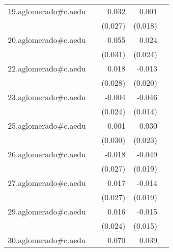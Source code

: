 {\begin{longtable}{l*{4}{D{.}{.}{-1}}}
\addlinespace
19.aglomerado#c.aedu&                     &       0.032         &       0.001         &                     \\
            &                     &     (0.027)         &     (0.018)         &                     \\
\addlinespace
20.aglomerado#c.aedu&                     &       0.055         &       0.024         &                     \\
            &                     &     (0.031)         &     (0.024)         &                     \\
\addlinespace
22.aglomerado#c.aedu&                     &       0.018         &      -0.013         &                     \\
            &                     &     (0.028)         &     (0.020)         &                     \\
\addlinespace
23.aglomerado#c.aedu&                     &      -0.004         &      -0.046\sym{***}&                     \\
            &                     &     (0.024)         &     (0.014)         &                     \\
\addlinespace
25.aglomerado#c.aedu&                     &       0.001         &      -0.030         &                     \\
            &                     &     (0.030)         &     (0.023)         &                     \\
\addlinespace
26.aglomerado#c.aedu&                     &      -0.018         &      -0.049\sym{*}  &                     \\
            &                     &     (0.027)         &     (0.019)         &                     \\
\addlinespace
27.aglomerado#c.aedu&                     &       0.017         &      -0.014         &                     \\
            &                     &     (0.027)         &     (0.019)         &                     \\
\addlinespace
29.aglomerado#c.aedu&                     &       0.016         &      -0.015         &                     \\
            &                     &     (0.024)         &     (0.015)         &                     \\
\addlinespace
30.aglomerado#c.aedu&                     &       0.070\sym{**} &       0.039\sym{*}  &                     \\

\end{longtable}}
